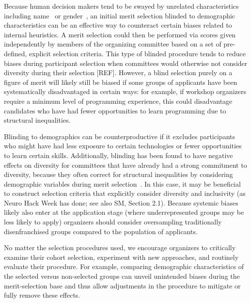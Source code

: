 Because human decision makers tend to be swayed by unrelated characteristics including name~\cite{bertrand2004} or gender~\cite{mossracusin2012}, an initial merit selection blinded to demographic characteristics can be an effective way to counteract certain biases related to internal heuristics. A merit selection could then be performed via scores given independently by members of the organizing committee based on a set of pre-defined, explicit selection criteria. This type of blinded procedure tends to reduce biases during participant selection when committees would otherwise not consider diversity during their selection [REF]. However, a blind selection purely on a figure of merit will likely still be biased if some groups of applicants have been systematically disadvantaged in certain ways: for example, if workshop organizers require a minimum level of programming experience, this could disadvantage candidates who have had fewer opportunities to learn programming due to structural inequalities. 

Blinding to demographics can be counterproductive if it excludes participants who might have had less exposure to certain technologies or fewer opportunities to learn certain skills. Additionally, blinding has been found to have negative effects on diversity for committees that have already had a strong commitment to diversity, because they often correct for structural inequalities by considering demographic variables during merit selection~\cite{behaghel2015unintended}.
In this case, it may be beneficial to construct selection criteria that explicitly consider diversity and inclusivity (as Neuro Hack Week has done; see also SM, Section 2.1). 
Because systemic biases likely also enter at the application stage (where underrepresented groups may be less likely to apply) organizers should consider oversampling traditionally disenfranchised groups compared to the population of applicants. 

No matter the selection procedures used, we encourage organizers to critically examine their cohort selection, experiment with new approaches, and routinely evaluate their procedure. For example, comparing demographic characteristics of the selected versus non-selected groups can unveil unintended biases during the merit-selection base and thus allow adjustments in the procedure to mitigate or fully remove these effects.
